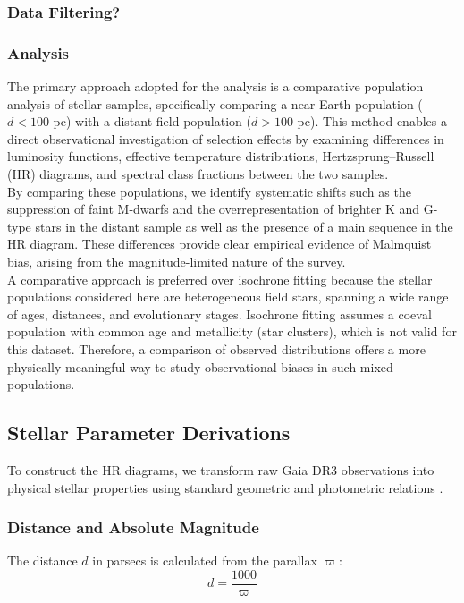 \documentclass[11pt]{article}
\begin{document}
\subsubsection{Data Filtering?}

\subsubsection{Analysis}
The primary approach adopted for the analysis is a comparative population analysis of stellar samples, specifically comparing a near-Earth population ($d < 100$ pc) with a distant field population ($d > 100$ pc)\cite{Gaia2023}. This method enables a direct observational investigation of selection effects by examining differences in luminosity functions, effective temperature distributions, Hertzsprung--Russell (HR) diagrams, and spectral class fractions between the two samples.\\

\noindent By comparing these populations, we identify systematic shifts such as the suppression of faint M-dwarfs and the overrepresentation of brighter K and G-type stars in the distant sample as well as the presence of a main sequence in the HR diagram. These differences provide clear empirical evidence of Malmquist bias, arising from the magnitude-limited nature of the survey\cite{Butkevich2005}.\\

\noindent A comparative approach is preferred over isochrone fitting because the stellar populations considered here are heterogeneous field stars, spanning a wide range of ages, distances, and evolutionary stages. Isochrone fitting assumes a coeval population with common age and metallicity (star clusters), which is not valid for this dataset. Therefore, a comparison of observed distributions offers a more physically meaningful way to study observational biases in such mixed populations.\\

\subsection{Stellar Parameter Derivations}

To construct the HR diagrams, we transform raw Gaia DR3 observations into physical stellar properties using standard geometric and photometric relations \cite{GaiaData}. 

\subsubsection{Distance and Absolute Magnitude}
The distance $d$ in parsecs is calculated from the parallax $\varpi$\cite{Lutz1973}:
\begin{equation}
    d = \frac{1000}{\varpi}
\end{equation}
\end{document}
